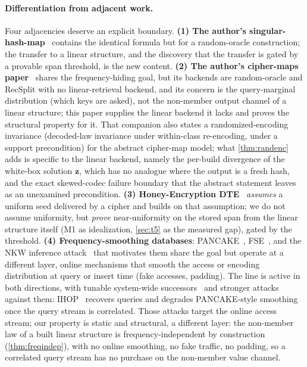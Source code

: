 \documentclass[acmsmall,review]{acmart}
\newcommand{\bz}{\mathbf{z}}                %
\begin{document}
\paragraph{Differentiation from adjacent work.}
Four adjacencies deserve an explicit boundary. \textbf{(1) The author's
singular-hash-map}~\cite{towell_bernoulli_maps} contains the identical formula but for a
random-oracle construction; the transfer to a linear structure, and the discovery that the
transfer is gated by a provable span threshold, is the new content. \textbf{(2) The author's
cipher-maps paper}~\cite{towell2026ciphermaps} shares the frequency-hiding goal, but its
backends are random-oracle and RecSplit with no linear-retrieval backend, and its concern is the
query-marginal distribution (which keys are asked), not the non-member output channel of a
linear structure; this paper supplies the linear backend it lacks and proves the structural
property for it. That companion also states a randomized-encoding invariance (decoded-law
invariance under within-class re-encoding, under a support precondition) for the abstract
cipher-map model; what \cref{thm:randenc} adds is specific to the linear backend, namely the
per-build divergence of the white-box solution $\bz$, which has no analogue where the output is
a fresh hash, and the exact skewed-codec failure boundary that the abstract statement leaves as
an unexamined precondition. \textbf{(3) Honey-Encryption DTE}~\cite{juels2014honey,cheng2019pmte}
\emph{assumes} a uniform seed delivered by a cipher and builds on that assumption; we do not
assume uniformity, but \emph{prove} near-uniformity on the stored span from the linear structure
itself (M1 as idealization, \cref{sec:t5} as the measured gap), gated by the threshold.
\textbf{(4) Frequency-smoothing databases}: PANCAKE~\cite{grubbs2020pancake},
FSE~\cite{lacharite2018fse}, and the NKW inference attack~\cite{naveed2015inference} that
motivates them share the goal but operate at a different layer, online mechanisms that smooth the
access or encoding distribution at query or insert time (fake accesses, padding). The line is
active in both directions, with tunable system-wide successors~\cite{zheng2024swat} and stronger
attacks against them: IHOP~\cite{oya2022ihop} recovers queries and degrades PANCAKE-style
smoothing once the query stream is correlated. Those attacks target the online access stream;
our property is static and structural, a different layer: the non-member law of a built linear
structure is frequency-independent by construction (\cref{thm:freqindep}), with no online
smoothing, no fake traffic, no padding, so a correlated query stream has no purchase on the
non-member value channel.
\end{document}
